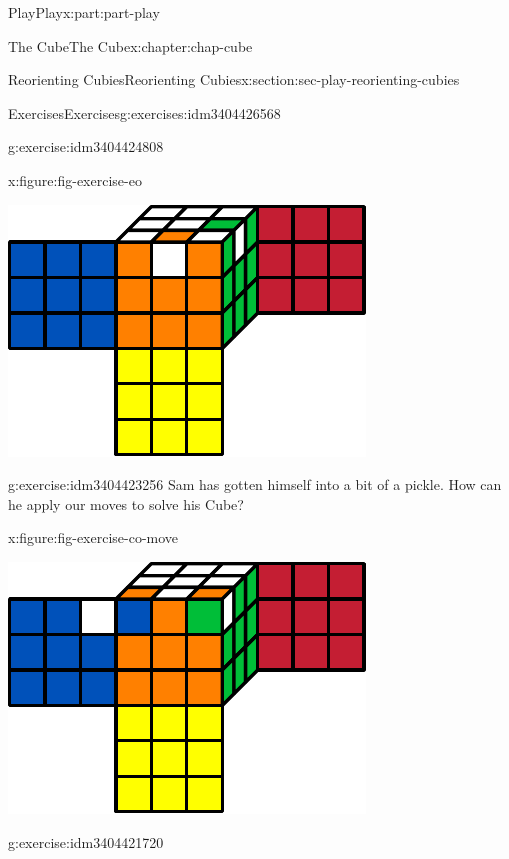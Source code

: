 \documentclass[oneside,10pt,]{book}
\numberwithin{equation}{section}
\begin{document}
\begin{partptx}{Play}{}{Play}{}{}{x:part:part-play}
\begin{chapterptx}{The Cube}{}{The Cube}{}{}{x:chapter:chap-cube}
\begin{sectionptx}{Reorienting Cubies}{}{Reorienting Cubies}{}{}{x:section:sec-play-reorienting-cubies}
\begin{exercises-subsection-numberless}{Exercises}{}{Exercises}{}{}{g:exercises:idm3404426568}
\begin{divisionexercise}{2}{}{}{g:exercise:idm3404424808}
\begin{figureptx}{}{x:figure:fig-exercise-eo}{}
\begin{image}{0.25}{0.5}{0.25}
\includegraphics[width=\linewidth]{./images/eo-exer.pdf}
\end{image}%
\tcblower
\end{figureptx}%
\end{divisionexercise}%
\begin{divisionexercise}{3}{}{}{g:exercise:idm3404423256}%
Sam has gotten himself into a bit of a pickle. How can he apply our moves to solve his Cube?%
\begin{figureptx}{}{x:figure:fig-exercise-co-move}{}%
\begin{image}{0.25}{0.5}{0.25}%
\includegraphics[width=\linewidth]{./images/co02.pdf}
\end{image}%
\tcblower
\end{figureptx}%
\end{divisionexercise}%
\begin{divisionexercise}{4}{}{}{g:exercise:idm3404421720}%

\end{divisionexercise}
\end{exercises-subsection-numberless}
\end{sectionptx}
\end{chapterptx}
\end{partptx}
\end{document}
